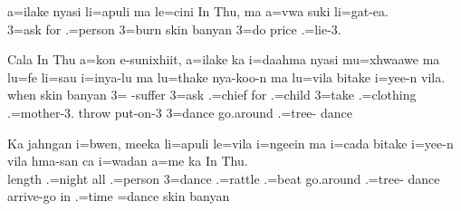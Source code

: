 \ea
\gll a=ilake nyasi li=apuli ma le=cini In Thu, ma a=vwa suki li=gat-ea.\\ 
     3=ask for .=person  3=burn skin banyan  3=do price .=lie-3.\\ 
     \glt {}
\z

\ea
\gll Cala In Thu a=kon e-sunixhiit, a=ilake ka i=daahma nyasi mu=xhwaawe ma lu=fe li=sau i=inya-lu ma lu=thake nya-koo-n ma lu=vila bitake i=yee-n vila.\\ when skin banyan 3= -suffer 3=ask  .=chief for .=child  3=take .=clothing .=mother-3.  throw put-on-3  3=dance go.around .=tree- dance\\ \glt {}
\z

\ea
\gll Ka jahngan i=bwen, meeka li=apuli le=vila i=ngeein ma i=cada bitake i=yee-n vila hma-san ca i=wadan a=me ka In Thu.\\  length .=night all .=person 3=dance .=rattle  .=beat go.around .=tree- dance arrive-go in .=time =dance  skin banyan\\ \glt {}
\z

